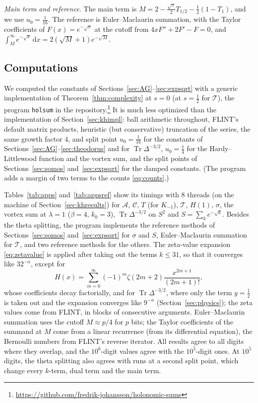 \documentclass[11pt,reqno]{amsart}
\theoremstyle{definition}
\theoremstyle{remark}
\newcommand{\dd}{\,\mathrm{d}}
\begin{document}
\emph{Main term and reference.} The main term is $M = 2 - \frac{\sqrt\pi}2T_{1/2} - \frac12(1 - T_1)$, and we use
$u_0 = \frac1{16}$. The reference is Euler--Maclaurin summation, with the Taylor coefficients of $F(x) = e^{-\sqrt x}$
at the cutoff from $4xF'' + 2F' - F = 0$, and $\int_M^\infty e^{-\sqrt x}\dd x = 2(\sqrt M+1)e^{-\sqrt M}$.

\subsection{Computations}\label{sec:appcomp}
We computed the constants of Sections~\ref{sec:AG}--\ref{sec:expsqrt} with a generic implementation of
Theorem~\ref{thm:complexity} at $s = 0$ (at $s = \frac12$ for $\mathcal T$), the program \texttt{holsum}
in the repository.\footnote{\url{https://github.com/fredrik-johansson/holonomic-sums}} It is much less optimized than the implementation of
Section~\ref{sec:khimpl}: ball arithmetic
throughout, FLINT's default matrix products, heuristic (but conservative) truncation of the
series, the same growth factor $4$, and split point $u_0 = \frac1{16}$ for the constants of
Sections~\ref{sec:AG}--\ref{sec:theodorus} and for $\operatorname{Tr}\Delta^{-3/2}$, $u_0 = \frac14$ for the Hardy--Littlewood function and the vortex sum, and
the split points of Sections~\ref{sec:somos} and~\ref{sec:expsqrt} for the damped constants. (The program adds a margin of two terms
to the counts \eqref{eq:counts}.)

Tables~\ref{tab:apps} and~\ref{tab:appsref} show its timings with $8$ threads (on
the machine of Section~\ref{sec:khresults}) for $\mathcal A$, $\mathcal C$, $T$ (for $K_{-1}$), $\mathcal T$, $H(1)$, $\sigma$,
the vortex sum at $\lambda = 1$ ($\beta = 4$, $k_0 = 3$), $\operatorname{Tr}\Delta^{-3/2}$ on $S^2$ and $S = \sum_ke^{-\sqrt k}$. Besides the theta splitting, the
program implements the reference methods of Sections~\ref{sec:somos} and~\ref{sec:expsqrt} for $\sigma$ and $S$, Euler--Maclaurin
summation for $\mathcal T$, and two reference methods for the others. The
zeta-value expansion \eqref{eq:zetavalue} is applied after taking out the terms $k \le 31$, so that it converges
like $32^{-n}$, except for
\[
  H(x) = \sum_{m=0}^{\infty}(-1)^m\zeta(2m+2)\frac{x^{2m+1}}{(2m+1)!},
\]
whose coefficients decay factorially, and for $\operatorname{Tr}\Delta^{-3/2}$, where only the term $y = \frac12$ is
taken out and the expansion converges like $9^{-n}$ (Section~\ref{sec:physics}); the zeta values come from FLINT, in blocks of consecutive arguments. Euler--Maclaurin summation uses the
cutoff $M \approx p/4$ for $p$ bits; the Taylor coefficients of the summand at $M$ come from a linear recurrence (from
its differential equation), the Bernoulli numbers from FLINT's reverse iterator. All results agree to all digits
where they overlap, and the $10^6$-digit values agree with the $10^5$-digit ones. At $10^5$ digits, the theta
splitting also agrees with runs at a second split point, which change every $k$-term, dual term and the main term.
\end{document}
